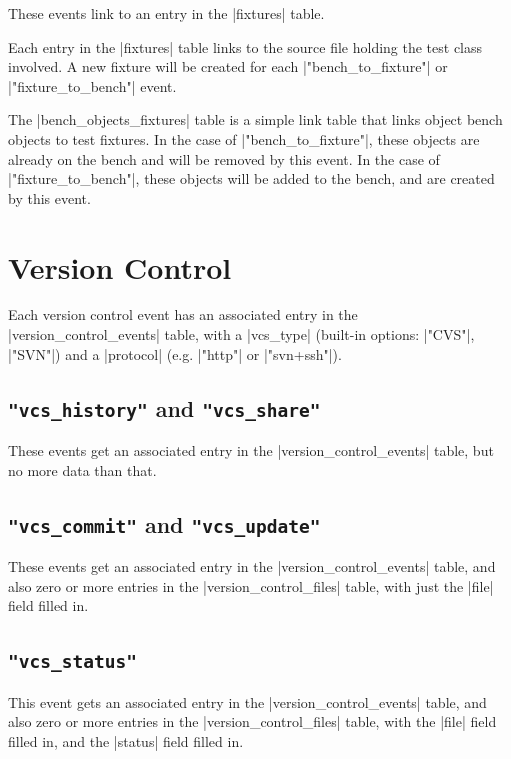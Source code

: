 \documentclass{report}
\begin{document}
These events link to an entry in the |fixtures| table.


Each entry in the |fixtures| table links to the source file holding the test
class involved.  A new fixture will be created for each |"bench_to_fixture"|
or |"fixture_to_bench"| event.


The |bench_objects_fixtures| table is a simple link table that links object
bench objects to test fixtures.  In the case of |"bench_to_fixture"|, these
objects are already on the bench and will be removed by this event.  In the
case of |"fixture_to_bench"|, these objects will be added to the bench, and
are created by this event.

\section{Version Control}



Each version control event has an associated entry in the
|version_control_events| table, with a |vcs_type| (built-in options:
|"CVS"|, |"SVN"|) and a |protocol| (e.g. |"http"| or |"svn+ssh"|).

\subsection{\lstinline!"vcs_history"! and \lstinline!"vcs_share"!}

These events get an associated entry in the |version_control_events|
table, but no more data than that.

\subsection{\lstinline!"vcs_commit"! and \lstinline!"vcs_update"!}

These events get an associated entry in the |version_control_events|
table, and also zero or more entries in the |version_control_files|
table, with just the |file| field filled in.

\subsection{\lstinline!"vcs_status"!}

This event gets an associated entry in the |version_control_events|
table, and also zero or more entries in the |version_control_files|
table, with the |file| field filled in, and the |status| field filled
in.
\end{document}
